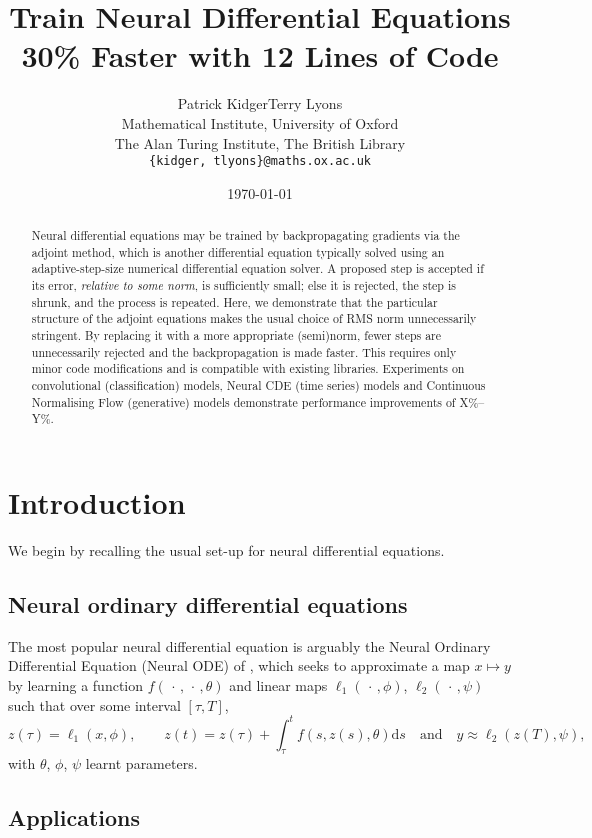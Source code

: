 \documentclass{article}
\title{Train Neural Differential Equations 30\% Faster with 12 Lines of Code}
\author{Patrick Kidger\qquad Terry Lyons\\
Mathematical Institute, University of Oxford\\
The Alan Turing Institute, The British Library\\
\texttt{\{kidger, tlyons\}@\hspace{0.8pt}maths.ox.ac.uk}}
\date{\today}
\theoremstyle{plain}
\theoremstyle{definition}
\begin{document}
\maketitle

\begin{abstract}
Neural differential equations may be trained by backpropagating gradients via the adjoint method, which is another differential equation typically solved using an adaptive-step-size numerical differential equation solver. A proposed step is accepted if its error, \emph{relative to some norm}, is sufficiently small; else it is rejected, the step is shrunk, and the process is repeated. Here, we demonstrate that the particular structure of the adjoint equations makes the usual choice of RMS norm unnecessarily stringent. By replacing it with a more appropriate (semi)norm, fewer steps are unnecessarily rejected and the backpropagation is made faster. This requires only minor code modifications and is compatible with existing libraries. Experiments on convolutional (classification) models, Neural CDE (time series) models and Continuous Normalising Flow (generative) models demonstrate performance improvements of X\%--Y\%. %
\end{abstract}

\section{Introduction}
We begin by recalling the usual set-up for neural differential equations.

\subsection{Neural ordinary differential equations}
The most popular neural differential equation is arguably the Neural Ordinary Differential Equation (Neural ODE) of \citet{E2017, neural-odes}, which seeks to approximate a map $x \mapsto y$ by learning a function $f(\,\cdot\,,\,\cdot\,, \theta)$ and linear maps $\ell_1(\,\cdot\,,\phi)$, $\ell_2(\,\cdot\,,\psi)$ such that over some interval $[\tau, T]$,
\begin{equation}\label{eq:node}
z(\tau) = \ell_1(x, \phi),\qquad z(t) = z(\tau) + \int_\tau^t f(s, z(s), \theta) \mathrm{d} s\quad\text{and}\quad y \approx \ell_2(z(T), \psi),
\end{equation}
with $\theta$, $\phi$, $\psi$ learnt parameters.

\subsection{Applications}
\end{document}
